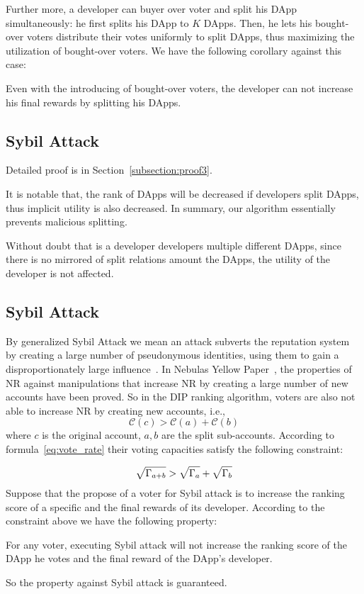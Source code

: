 Further more, a developer can buyer over voter and split his DApp simultaneously: he first splits his DApp to $K$ DApps. Then, he lets his bought-over voters distribute their votes uniformly to split DApps, thus  maximizing the utilization of  bought-over  voters. We have the following corollary against this case:
\begin{corollary}
	\label{c1}
	Even with the introducing of bought-over voters, the developer can not increase his final rewards by splitting his DApps.
\end{corollary}
\subsection{Sybil Attack}
Detailed proof is in Section~\ref{subsection:proof3}.

It is notable that, the rank of DApps will be decreased if developers split DApps, thus implicit utility is also decreased. In summary, our algorithm essentially prevents malicious splitting.

Without doubt that is a developer developers multiple different  DApps, since there is no mirrored of split relations amount the DApps, the utility of the developer is not affected.

\subsection{Sybil Attack}
By generalized Sybil Attack we mean an attack subverts the reputation system by creating a large number of pseudonymous identities, using them to gain a disproportionately large influence~\cite{quercia2010sybil}. In Nebulas Yellow Paper~\cite{Nebulasyellowpaper}, the properties of NR against manipulations that increase NR by creating a large number of new accounts have been proved. So in the DIP ranking algorithm, voters are also not able to increase NR by creating new accounts, i.e.,
$$\mathcal{C}(c)>\mathcal{C}(a)+\mathcal{C}(b)$$
where $c$ is the original account, $a,b$ are the split sub-accounts. According to formula~\ref{eq:vote_rate} their voting capacities satisfy the following constraint:

\begin{align}
	\label{eq:sqrt_nr}
	\sqrt{\Gamma_{a+b}}>\sqrt{\Gamma_a}+\sqrt{\Gamma_b}
\end{align}
Suppose that the propose of a voter for Sybil attack is to increase the ranking score of a specific and the final rewards of its developer. According to the constraint above we have the following property:

\begin{property}
	\label{p3}
    For any voter, executing Sybil attack will not increase the ranking score of the DApp he votes and the final reward of the DApp's developer.
\end{property}
So the property against Sybil attack is guaranteed.


